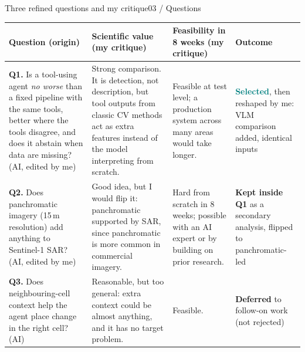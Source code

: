 \documentclass[aspectratio=169,11pt]{beamer}
\begin{document}
\begin{frame}[shrink=14]{Three refined questions and my critique}{03 / Questions}
\scriptsize
\begin{tabularx}{\textwidth}{@{}>{\raggedright\arraybackslash}p{3.4cm}YY>{\raggedright\arraybackslash}p{2.9cm}@{}}
\toprule
\textbf{Question} {\color{muted}(origin)} & \textbf{Scientific value (my critique)} & \textbf{Feasibility in 8 weeks (my critique)} & \textbf{Outcome} \\
\midrule
\textbf{Q1.} Is a tool-using agent \emph{no worse} than a fixed pipeline with the same tools, better where the tools disagree, and does it abstain when data are missing? {\color{muted}(AI, edited by me)}
 & Strong comparison. It is detection, not description, but tool outputs from classic CV methods act as extra features instead of the model interpreting from scratch.
 & Feasible at test level; a production system across many areas would take longer.
 & \textcolor{teal}{\textbf{Selected}}, then reshaped by me: VLM comparison added, identical inputs \\
\addlinespace
\textbf{Q2.} Does panchromatic imagery (15\,m resolution) add anything to Sentinel-1 SAR? {\color{muted}(AI, edited by me)}
 & Good idea, but I would flip it: \alert{panchromatic supported by SAR}, since panchromatic is more common in commercial imagery.
 & Hard from scratch in 8 weeks; possible with an AI expert or by building on prior research.
 & \textcolor{amber}{\textbf{Kept inside Q1}} as a secondary analysis, flipped to panchromatic-led \\
\addlinespace
\textbf{Q3.} Does neighbouring-cell context help the agent place change in the right cell? {\color{muted}(AI)}
 & Reasonable, but too general: extra context could be almost anything, and it has no target problem.
 & Feasible.
 & \textcolor{muted}{\textbf{Deferred}} to follow-on work (not rejected) \\
\bottomrule
\end{tabularx}
\end{frame}
\end{document}

